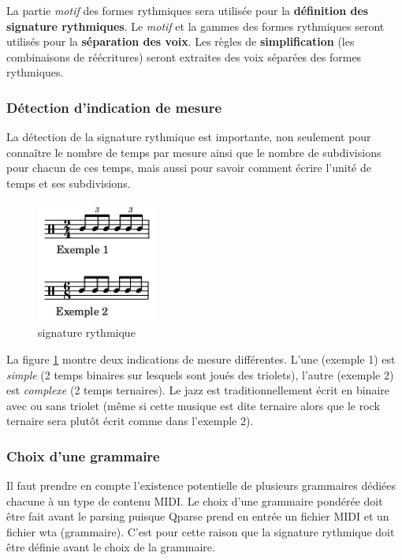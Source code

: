 La partie \textit{motif} des formes rythmiques sera utilisée pour la \textbf{définition des signature rythmiques}. 
Le \textit{motif} et la gammes des formes rythmiques seront utilisés pour la \textbf{séparation des voix}. 
Les règles de \textbf{simplification} (les combinaisons de réécritures) seront extraites des voix séparées des formes rythmiques.

\subsubsection{Détection d’indication de mesure}
La détection de la signature rythmique est importante, 
non seulement pour connaître le nombre de temps par mesure ainsi que le nombre
de subdivisions pour chacun de ces temps, mais aussi pour savoir comment écrire
l’unité de temps et ses subdivisions.

\begin{figure}[h]
	\centering
	\includegraphics[height=40mm, width=40mm]{z_images/3_methodes/2_systemes/0_simple_VS_complexe.png}
	\caption{signature rythmique}
	\label{subdivisions}
\end{figure} %

La figure \ref{subdivisions} montre deux indications de mesure différentes. 
L’une (exemple 1) est \textit{simple} (2 temps binaires sur lesquels sont joués des triolets), 
l’autre (exemple 2) est \textit{complexe} (2 temps ternaires). 
Le jazz est traditionnellement écrit en binaire avec ou sans triolet (même si cette musique est dite ternaire alors que le rock ternaire sera plutôt écrit comme dans l’exemple 2).

\subsubsection{Choix d’une grammaire}
Il faut prendre en compte l’existence potentielle de plusieurs grammaires dédiées chacune à un type de contenu MIDI. 
Le choix d’une grammaire pondérée doit être fait avant le parsing puisque Qparse prend en entrée un fichier MIDI et un fichier wta (grammaire). C’est pour cette raison que la signature rythmique doit être définie avant le choix de la grammaire.

